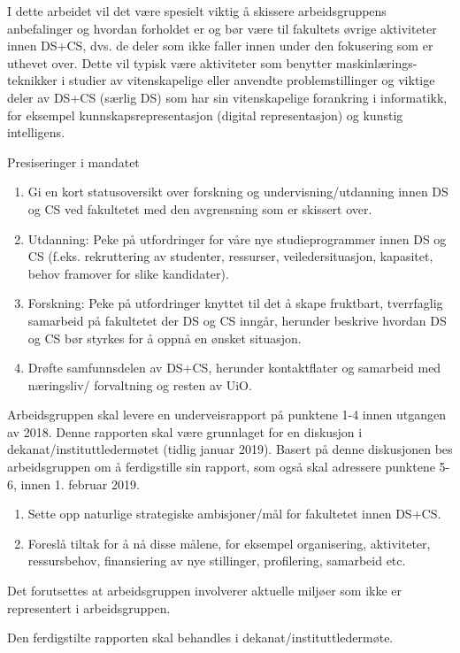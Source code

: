 \documentclass[a4paper,10pt]{article}
\newcounter{save}
\begin{document}
I dette arbeidet vil det være spesielt viktig å skissere arbeidsgruppens anbefalinger og
hvordan forholdet er og bør være til fakultets øvrige aktiviteter innen DS+CS, dvs. de deler
som ikke faller innen under den fokusering som er uthevet over. Dette vil typisk være
aktiviteter som benytter maskinlærings-teknikker i studier av vitenskapelige eller anvendte
problemstillinger og viktige deler av DS+CS (særlig DS) som har sin vitenskapelige
forankring i informatikk, for eksempel kunnskapsrepresentasjon (digital representasjon) og
kunstig intelligens.

Presiseringer i mandatet
\begin{enumerate}
\item Gi en kort statusoversikt over forskning og undervisning/utdanning innen DS og CS
ved fakultetet med den avgrensning som er skissert over.
\item Utdanning: Peke på utfordringer for våre nye studieprogrammer innen DS og CS
(f.eks. rekruttering av studenter, ressurser, veiledersituasjon, kapasitet, behov
framover for slike kandidater).
\item Forskning: Peke på utfordringer knyttet til det å skape fruktbart, tverrfaglig
samarbeid på fakultetet der DS og CS inngår, herunder beskrive hvordan DS og CS
bør styrkes for å oppnå en ønsket situasjon.
\item Drøfte samfunnsdelen av DS+CS, herunder kontaktflater og samarbeid med
næringsliv/ forvaltning og resten av UiO.
\setcounter{save}{\value{enumi}}
\end{enumerate}
Arbeidsgruppen skal levere en underveisrapport på punktene 1-4 innen utgangen av 2018.
Denne rapporten skal være grunnlaget for en diskusjon i dekanat/instituttledermøtet
(tidlig januar 2019). Basert på denne diskusjonen bes arbeidsgruppen om å ferdigstille sin
rapport, som også skal adressere punktene 5-6, innen 1. februar 2019.
\begin{enumerate}
\setcounter{enumi}{\value{save}}
\item Sette opp naturlige strategiske ambisjoner/mål for fakultetet innen DS+CS.
\item Foreslå tiltak for å nå disse målene, for eksempel organisering, aktiviteter,
ressursbehov, finansiering av nye stillinger, profilering, samarbeid etc.
\end{enumerate}
Det forutsettes at arbeidsgruppen involverer aktuelle miljøer som ikke er representert i
arbeidsgruppen.

Den ferdigstilte rapporten skal behandles i dekanat/instituttledermøte.
\end{document}
